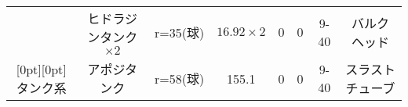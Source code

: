 \documentclass[15pt,uplatex,dvipdfmx]{jsarticle}
\begin{document}
\begin{tabularx}{55zw}{c|c c c C C C c }
  & ヒドラジンタンク$\times 2$ & r=35(球) & $16.92 \times 2$ & 0 & 0 & 9-40 & バルクヘッド \\ 
  \raisebox{.5\normalbaselineskip}[0pt][0pt]{タンク系}
  & アポジタンク & r=58(球) & 155.1 & 0 & 0 & 9-40 & スラストチューブ \\ \hline

\end{tabularx}
\end{document}

